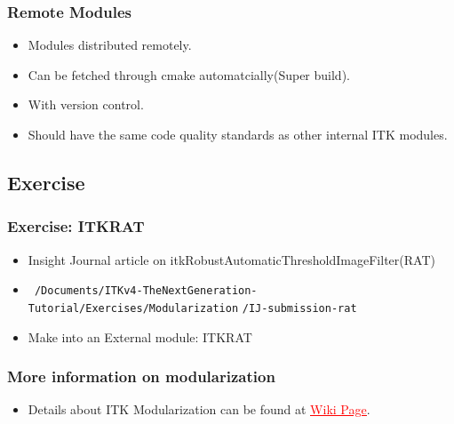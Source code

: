 \begin{frame}
\frametitle{Remote Modules }
\begin{itemize}
\item Modules distributed remotely.
\item Can be fetched through cmake automatcially(Super build).
\item With version control.
\item Should have the same code quality standards as other internal ITK modules.
\end{itemize}
\end{frame}
\subsection{Exercise}
\begin{frame}
\frametitle{Exercise: ITKRAT}
\small
\begin{itemize}
\item  Insight Journal article on itkRobustAutomaticThresholdImageFilter(RAT)
\item
\texttt{~/Documents/ITKv4-TheNextGeneration-Tutorial/Exercises/Modularization}
\texttt{/IJ-submission-rat}
\item  Make into an External module: ITKRAT
\end{itemize}
\end{frame}


\begin{frame}
\frametitle{More information on modularization}
\begin{itemize}
\item  Details about ITK Modularization can be found at \href{http://www.itk.org/Wiki/ITK\_Release\_4/Modularization}{\textcolor{red}{\underline{Wiki Page}}}.
\end{itemize}
\end{frame}
